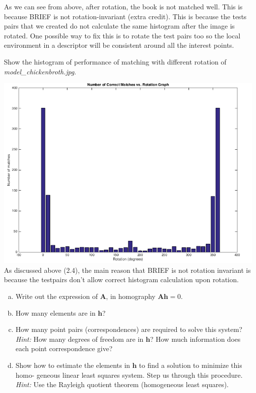 \documentclass[12pt,letterpaper,boxed]{hmcpset}
\begin{document}
\begin{solution}
  As we can see from above, after rotation, the book is not matched well. This is because BRIEF is not
  rotation-invariant (extra credit). This is because the tests pairs that we created do not calculate 
  the same histogram after the image is rotated. One possible way to fix this is to rotate the test pairs
  too so the local environment in a descriptor will be consistent around all the interest points.
\end{solution}

\begin{problem}[2.5]
  Show the histogram of performance of matching with different rotation of \textit{model\_chickenbroth.jpg}.
\end{problem}

\begin{solution}
  \includegraphics[width=\textwidth]{2_5.png}\\
  As discussed above (2.4), the main reason that BRIEF is not rotation invariant is because the testpairs don't 
  allow correct histogram calculation upon rotation.
\end{solution}
\newpage

\begin{problem}[3.1]
 \begin{enumerate}[(a)]
   \item Write out the expression of $\mathbf{A}$, in homography $\mathbf{Ah} = 0$.
   \item How many elements are in $\mathbf{h}$?
   \item How many point pairs (correspondences) are required to solve this system?\\
         \textit{Hint:} How many degrees of freedom are in $\mathbf{h}$? How much information does each point correspondence give?
  \item Show how to estimate the elements in $\mathbf{h}$ to find a solution to minimize this homo- geneous linear least squares system. Step us through this procedure.\\
  \textit{Hint:}  Use the Rayleigh quotient theorem (homogeneous least squares).
 \end{enumerate}
\end{problem}
\end{document}
